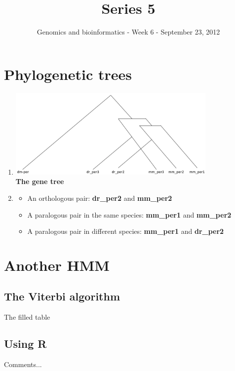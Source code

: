 \documentclass[a4paper,11pt]{article}
\title{Series 5}
\date{}
\author{Genomics and bioinformatics - Week 6 - September 23, 2012}
\begin{document}
\maketitle

\section{Phylogenetic trees}

\begin{enumerate}
\item 
\begin{center}
\includegraphics[width=0.8\textwidth]{tree.png}\\
\vspace{0.5cm}
{\bf The gene tree}
\end{center}

\item
\begin{itemize} 
\item An orthologous pair: {\bf dr\_per2} and {\bf mm\_per2}

\item A paralogous pair in the same species: {\bf mm\_per1} and {\bf mm\_per2}

\item A paralogous pair in different species: {\bf mm\_per1} and {\bf dr\_per2}
\end{itemize}
\end{enumerate}

\section{Another HMM}

\subsection{The Viterbi algorithm}

The filled table

\subsection{Using R}

Comments...
\end{document}
